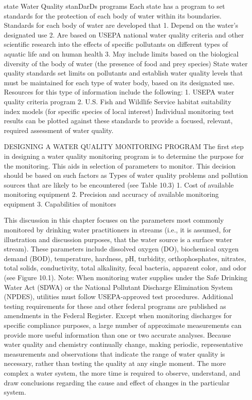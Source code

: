 \documentclass{article}
\begin{document}
state Water Quality stanDarDs programs Each state has a program to set
standards for the protection of each body of water within its
boundaries. Standards for each body of water are developed that 1.
Depend on the water's designated use 2. Are based on USEPA national
water quality criteria and other scientific research into the effects of
specific pollutants on different types of aquatic life and on human
health 3. May include limits based on the biological diversity of the
body of water (the presence of food and prey species) State water
quality standards set limits on pollutants and establish water quality
levels that must be maintained for each type of water body, based on its
designated use. Resources for this type of information include the
following: 1. USEPA water quality criteria program 2. U.S. Fish and
Wildlife Service habitat suitability index models (for specific species
of local interest) Individual monitoring test results can be plotted
against these standards to provide a focused, relevant, required
assessment of water quality.

DESIGNING A WATER QUALITY MONITORING PROGRAM The first step in designing
a water quality monitoring program is to determine the purpose for the
monitoring. This aids in selection of parameters to monitor. This
decision should be based on such factors as Types of water quality
problems and pollution sources that are likely to be encountered (see
Table 10.3) 1. Cost of available monitoring equipment 2. Precision and
accuracy of available monitoring equipment 3. Capabilities of monitors

This discussion in this chapter focuses on the parameters most commonly
monitored by drinking water practitioners in streams (i.e., it is
assumed, for illustration and discussion purposes, that the water source
is a surface water stream). These parameters include dissolved oxygen
(DO), biochemical oxygen demand (BOD), temperature, hardness, pH,
turbidity, orthophosphates, nitrates, total solids, conductivity, total
alkalinity, fecal bacteria, apparent color, and odor (see Figure 10.1).
Note: When monitoring water supplies under the Safe Drinking Water Act
(SDWA) or the National Pollutant Discharge Elimination System (NPDES),
utilities must follow USEPA-approved test procedures. Additional testing
requirements for these and other federal programs are published as
amendments in the Federal Register. Except when monitoring discharges
for specific compliance purposes, a large number of approximate
measurements can provide more useful information than one or two
accurate analyses. Because water quality and chemistry continually
change, making periodic, representative measurements and observations
that indicate the range of water quality is necessary, rather than
testing the quality at any single moment. The more complex a water
system, the more time is required to observe, understand, and draw
conclusions regarding the cause and effect of changes in the particular
system.
\end{document}
